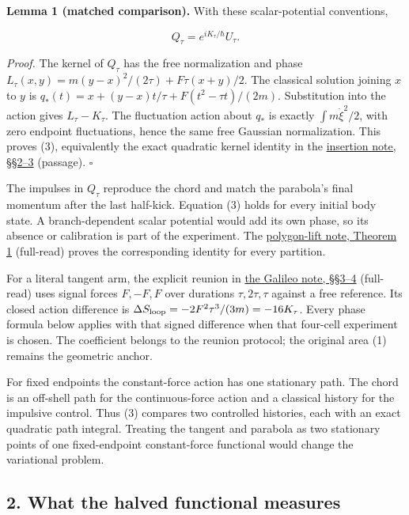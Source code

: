 \documentclass[11pt,a4paper]{article}
\begin{document}
\textbf{Lemma 1 (matched comparison).} With these scalar-potential
conventions,

\[Q_\tau=e^{iK_\tau/\hbar}U_\tau.\tag{3}\]

\emph{Proof.} The kernel of \(Q_\tau\) has the free normalization and
phase \(L_\tau(x,y)=m(y-x)^2/(2\tau)+F\tau(x+y)/2\). The classical
solution joining \(x\) to \(y\) is
\(q_*(t)=x+(y-x)t/\tau+F(t^2-\tau t)/(2m)\). Substitution into the
action gives \(L_\tau-K_\tau\). The fluctuation action about \(q_*\) is
exactly \(\int m\dot\xi^2/2\), with zero endpoint fluctuations, hence
the same free Gaussian normalization. This proves (3), equivalently the
exact quadratic kernel identity in the
\href{refinement-composition-and-limit.md}{insertion note, §§2--3}
(passage). \(\square\)

The impulses in \(Q_\tau\) reproduce the chord and match the parabola's
final momentum after the last half-kick. Equation (3) holds for every
initial body state. A branch-dependent scalar potential would add its
own phase, so its absence or calibration is part of the experiment. The
\href{cut-measure-newton.md\#weyl-lifting-and-polygon-phases}{polygon-lift
note, Theorem 1} (full-read) proves the corresponding identity for every
partition.

For a literal tangent arm, the explicit reunion in
\href{newton-insertion-action.md}{the Galileo note, §§3--4} (full-read)
uses signal forces \(F,-F,F\) over durations \(\tau,2\tau,\tau\) against
a free reference. Its closed action difference is
\(\Delta S_{\rm loop}=-2F^2\tau^3/(3m)=-16K_\tau\). Every phase formula
below applies with that signed difference when that four-cell experiment
is chosen. The coefficient belongs to the reunion protocol; the original
area (1) remains the geometric anchor.

For fixed endpoints the constant-force action has one stationary path.
The chord is an off-shell path for the continuous-force action and a
classical history for the impulsive control. Thus (3) compares two
controlled histories, each with an exact quadratic path integral.
Treating the tangent and parabola as two stationary points of one
fixed-endpoint constant-force functional would change the variational
problem.

\subsection{2. What the halved functional
measures}\label{what-the-halved-functional-measures}
\end{document}
